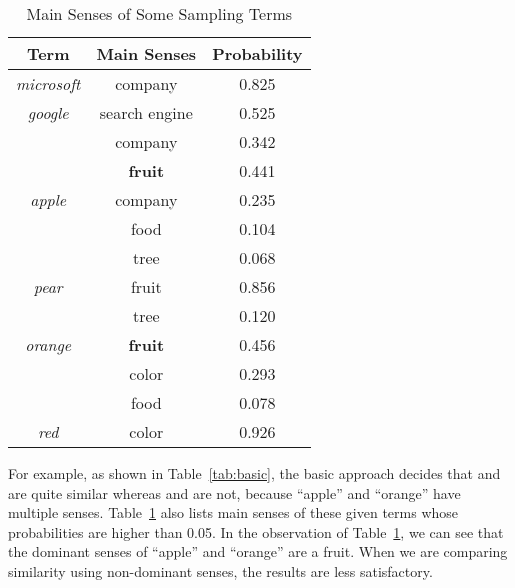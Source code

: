 \begin{table}[!h]
\centering
\caption{Main Senses of Some Sampling Terms}\label{tab:senses}
\begin{tabular}{c|c|c}\hline
Term & Main Senses & Probability \\ \hline
\emph{microsoft} & company &0.825\\\hline
\emph{google} & search engine &0.525\\\cline{2-3}
 & company & 0.342\\\hline
 & \textbf{fruit} &0.441\\\cline{2-3}
\emph{apple} & company &0.235\\\cline{2-3}
& food &0.104\\\cline{2-3}
& tree &0.068\\\hline
\emph{pear} & fruit & 0.856\\\cline{2-3}
     & tree & 0.120\\\hline
\emph{orange} & \textbf{fruit} & 0.456\\\cline{2-3}
& color & 0.293\\\cline{2-3}
& food & 0.078\\\hline
\emph{red} & color & 0.926\\\hline
\end{tabular}
\end{table}

For example, as shown in Table~\ref{tab:basic}, the basic approach
decides that  and  are quite
similar whereas  and  are
not, because ``apple'' and ``orange'' have multiple senses. Table~\ref{tab:senses} also lists main senses of these given terms whose probabilities are higher than 0.05. In the observation of Table~\ref{tab:senses}, we can see that the dominant senses of ``apple'' and ``orange'' are a fruit. When we are comparing similarity using non-dominant senses, the results are less satisfactory.


%

